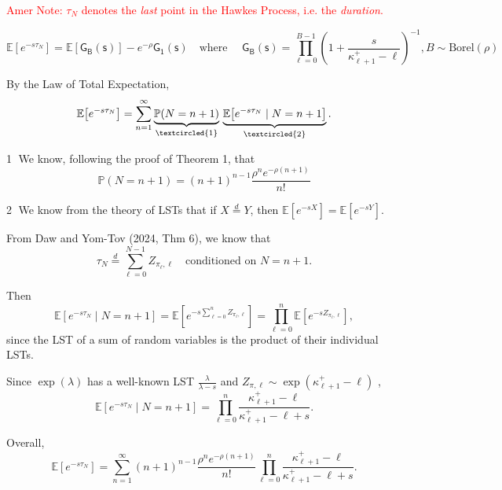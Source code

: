 \documentclass[opre,nonblindrev]{informs4}
\begin{document}

\textcolor{red}{Amer Note: $\tau_N$ denotes the \textit{last} point in the Hawkes Process, i.e. the \textit{duration}.}

\begin{theorem}

\[
\mathbb{E}\left[e^{-s\tau_N}\right]
= \mathbb{E}\left[\mathsf{G_B( s)}\right] - e^{-\rho} \mathsf{G_1( s)}
\quad \text{where } \quad
\mathsf{G_B(s)} = \prod_{\ell=0}^{B-1} \left(1 + \frac{s}{\kappa_{\ell+1}^+ - \ell}\right)^{-1}, B \sim \mathrm{Borel}(\rho)
\]

\end{theorem}


By the Law of Total Expectation,  
\[
\mathbb{E}\!\left[e^{-s\tau_N}\right]
= \sum_{n=1}^{\infty} \underbrace{\mathbb{P}(N=n+1)}_{\textcircled{1}}
\, \underbrace{\mathbb{E}\!\left[e^{-s\tau_N}\mid N=n+1\right]}_{\textcircled{2}}.
\]

\textcircled{1} We know, following the proof of Theorem 1, that  
\[
\mathbb{P}(N=n+1) = (n+1)^{n-1}\frac{\rho^{n} e^{-\rho(n+1)}}{n!}
\]

\textcircled{2} We know from the theory of LSTs that if \(X \overset{d}{=} Y\), then
\(\mathbb{E}[e^{-sX}] = \mathbb{E}[e^{-sY}]\).

From Daw and Yom-Tov (2024, Thm 6), we know that  
\[
\tau_N \overset{d}{=} \sum_{\ell=0}^{N-1} Z_{\pi_\ell,\ell}
\quad \text{conditioned on } N=n+1.
\]

Then  
\[
\mathbb{E}\!\left[e^{-s\tau_N}\mid N=n+1\right]
= \mathbb{E}\!\left[e^{-s\sum_{\ell=0}^{n} Z_{\pi_\ell,\ell}}\right]
= \prod_{\ell=0}^{n} \mathbb{E}\!\left[e^{-sZ_{\pi_\ell,\ell}}\right],
\]
since the LST of a sum of random variables is the product of their individual LSTs.

Since $\exp(\lambda)$ has a well-known LST $\frac{\lambda}{\lambda-s}$ and \(Z_{\pi,\ell} \sim \exp(\kappa_{\ell+1}^+ - \ell)\) $$,  
\[
\mathbb{E}\!\left[e^{-s\tau_N}\mid N=n+1\right]
= \prod_{\ell=0}^{n}
\frac{\kappa_{\ell+1}^+ - \ell}{\kappa_{\ell+1}^+ - \ell + s}.
\]

Overall,  
\[
\mathbb{E}\!\left[e^{-s\tau_N}\right]
= \sum_{n=1}^{\infty}
(n+1)^{n-1}\frac{\rho^{n} e^{-\rho(n+1)}}{n!}
\prod_{\ell=0}^{n}
\frac{\kappa_{\ell+1}^+ - \ell}{\kappa_{\ell+1}^+ - \ell + s}.
\]
\end{document}
